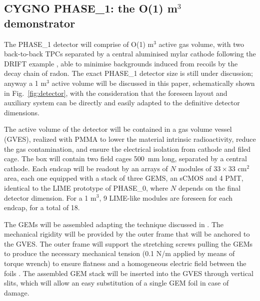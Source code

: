 \documentclass[physics,article,submit,moreauthors,pdftex]{Definitions/mdpi}
\begin{document}
\subsection{CYGNO PHASE\_1: the O(1) m$^3$ demonstrator}\label{sec:phase1}
The PHASE\_1 detector will comprise of  O(1) m$^3$ active gas volume, with two back-to-back TPCs separated by a central aluminised mylar cathode following the DRIFT example \cite{bib:drift1, bib:drift2, Battat:2015rna}, able to minimise backgrounds induced from recoils by the decay chain of radon. 
The exact PHASE\_1 detector size is still under discussion; anyway a 1 m$^3$ active volume will be discussed in this paper, schematically shown in Fig.~\ref{fig:detector},
with the consideration that the foreseen layout and auxiliary system can be directly and easily adapted to the definitive detector dimensions.

The active volume of the detector will be contained in a gas volume vessel (GVES), realized with PMMA to lower the material intrinsic radioactivity, reduce the gas contamination, and ensure the electrical isolation from cathode and filed cage. 
The box will contain two field cages 500~mm long, separated by a central cathode. Each endcap will be readout by an arrays of $N$ modules of $33 \times 33$ cm$^2$  area, each one equipped with a stack of three GEMS, an sCMOS and 4 PMT, identical to the LIME prototype of PHASE\_0, where $N$ depends on the final detector dimension. For a 1 m$^3$, 9 LIME-like modules are foreseen for each endcap, for a total of 18.

The GEMs will be assembled adapting the technique discussed in \cite{Colaleo:2015vsq}. The mechanical rigidity will be provided by the outer frame that will be anchored to the GVES. The outer frame will support the stretching screws pulling the GEMs to produce the necessary mechanical tension (0.1 N/m applied by means of torque wrench) to ensure flatness and a homogeneous electric field between the foils \cite{Benussi:2015omy}. The assembled GEM stack will be inserted into the GVES through vertical slits, which will allow an easy substitution of a single GEM foil in case of damage.
\end{document}
